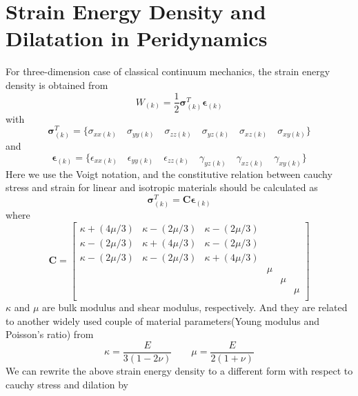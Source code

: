 \documentclass[a4paper,11pt,CJK]{paper}
\begin{document}
\section{Strain Energy Density and Dilatation in Peridynamics}
For three-dimension case of classical continuum mechanics, the strain energy density is obtained from
\begin{equation}
W_{(k)} = \frac{1}{2}\bm{\sigma}^T_{(k)}\bm{\epsilon}_{(k)}
\end{equation}
with
\begin{equation}
\bm{\sigma}^T_{(k)} = \{\sigma_{xx(k)}\quad\sigma_{yy(k)}\quad\sigma_{zz(k)}\quad\sigma_{yz(k)}\quad\sigma_{xz(k)}\quad\sigma_{xy(k)}\}
\end{equation}
and
\begin{equation}
\bm{\epsilon}_{(k)} = \{\epsilon_{xx(k)}\quad\epsilon_{yy(k)}\quad\epsilon_{zz(k)}\quad\gamma_{yz(k)}\quad\gamma_{xz(k)}\quad\gamma_{xy(k)}\}
\end{equation}
Here we use the Voigt notation, and the constitutive relation between cauchy stress and strain for linear and isotropic materials should be calculated as
\begin{equation}
\bm{\sigma}^T_{(k)} = \textbf{C}\bm{\epsilon}_{(k)}
\end{equation}
where
\begin{equation}
\textbf{C} = \left[
               \begin{array}{cccccc}
                 \kappa+(4\mu/3) & \kappa-(2\mu/3) & \kappa-(2\mu/3) &  &  &  \\
                 \kappa-(2\mu/3) & \kappa+(4\mu/3) & \kappa-(2\mu/3) &  &  &  \\
                 \kappa-(2\mu/3) & \kappa-(2\mu/3) & \kappa+(4\mu/3) &  &  &  \\
                   &  &  & \mu &  &  \\
                   &  &  &  & \mu &  \\
                   &  &  &  &  & \mu \\
               \end{array}
             \right]
\end{equation}
$\kappa$ and $\mu$ are bulk modulus and shear modulus, respectively.
And they are related to another widely used couple of material parameters(Young modulus and Poisson's ratio) from
\begin{equation}
\kappa = \frac{E}{3(1-2\nu)} \qquad \mu = \frac{E}{2(1+\nu)}
\end{equation}
We can rewrite the above strain energy density to a different form with respect to cauchy stress and dilation by
\end{document}
